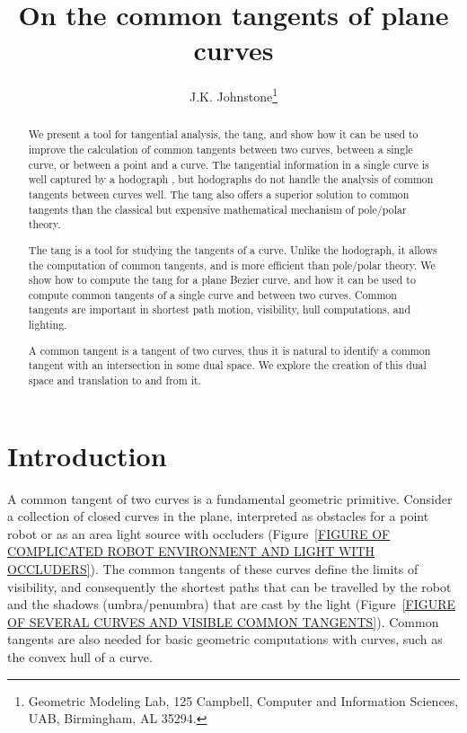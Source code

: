 \documentclass[11pt]{article}
\title{On the common tangents of plane curves}
\author{J.K. Johnstone\thanks{Geometric Modeling Lab, 125 Campbell, 
	Computer and Information Sciences, UAB, Birmingham, AL 35294.}}
\begin{document}
\maketitle

\begin{abstract}
We present a tool for tangential analysis, the tang,
and show how it can be used to improve the calculation
of common tangents between two curves, between a single curve, or between 
a point and a curve.
The tangential information in a single curve is well captured by a hodograph
\cite{farin97}, but hodographs do not handle 
the analysis of common tangents between curves well.
The tang also offers a superior solution to common tangents
than the classical but expensive mathematical mechanism of pole/polar theory.

The tang is a tool for studying the tangents of a curve.
Unlike the hodograph, it allows the computation of common tangents, 
and is more efficient than pole/polar theory.
We show how to compute the tang for a plane Bezier curve,
and how it can be used to compute common tangents of a single curve
and between two curves.
Common tangents are important in shortest path motion, visibility,
hull computations, and lighting.

A common tangent is a tangent of two curves, thus it is natural
to identify a common tangent with an intersection in some dual space.
We explore the creation of this dual space and translation to and from it.
\end{abstract} 

\clearpage

\section{Introduction}

A common tangent of two curves is a fundamental geometric primitive.
Consider a collection of closed curves in the plane, interpreted as 
obstacles for a point robot or as an area light source with occluders
(Figure~\ref{FIGURE OF COMPLICATED ROBOT ENVIRONMENT AND LIGHT WITH OCCLUDERS}).
The common tangents of these curves define the limits of visibility,
and consequently the shortest paths that can be travelled by the robot 
and the shadows (umbra/penumbra) that are cast by the light
(Figure~\ref{FIGURE OF SEVERAL CURVES AND VISIBLE COMMON TANGENTS}).
Common tangents are also needed for basic geometric computations with curves,
such as the convex hull of a curve.
\end{document}
